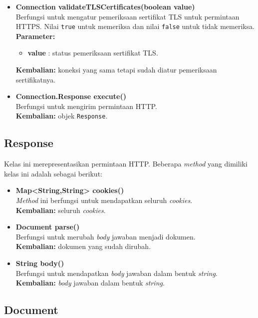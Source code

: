\begin{itemize}
		\item \textbf{Connection validateTLSCertificates(boolean value)} \\
		Berfungsi untuk mengatur pemeriksaan sertifikat TLS untuk permintaan HTTPS. Nilai \texttt{true} untuk memeriksa dan nilai \texttt{false} untuk tidak memeriksa.\\
		\textbf{Parameter:}
		\begin{itemize}
			\item \textbf{value} : status pemeriksaan sertifikat TLS.
		\end{itemize}
		\textbf{Kembalian:} koneksi yang sama tetapi sudah diatur pemeriksaan sertifikatnya.
		
		\item \textbf{Connection.Response execute()} \\
		Berfungsi untuk mengirim permintaan HTTP.\\
		\textbf{Kembalian:} objek \texttt{Response}.	
\end{itemize}

\subsection{Response}

Kelas ini merepresentasikan permintaan HTTP. Beberapa \textit{method} yang dimiliki kelas ini adalah sebagai berikut:
\begin{itemize}
	\item \textbf{Map<String,String> cookies()} \\
		\textit{Method} ini berfungsi untuk mendapatkan seluruh \textit{cookies}. \\
		\textbf{Kembalian:} seluruh \textit{cookies}.	
		
		\item \textbf{Document parse()} \\
		Berfungsi untuk merubah \textit{body} jawaban menjadi dokumen. \\
		\textbf{Kembalian:} dokumen yang sudah dirubah.
		
		\item \textbf{String body()} \\
		Berfungsi untuk mendapatkan \textit{body} jawaban dalam bentuk \textit{string}. \\
		\textbf{Kembalian:} \textit{body} jawaban dalam bentuk \textit{string}.
\end{itemize}

\subsection{Document}

